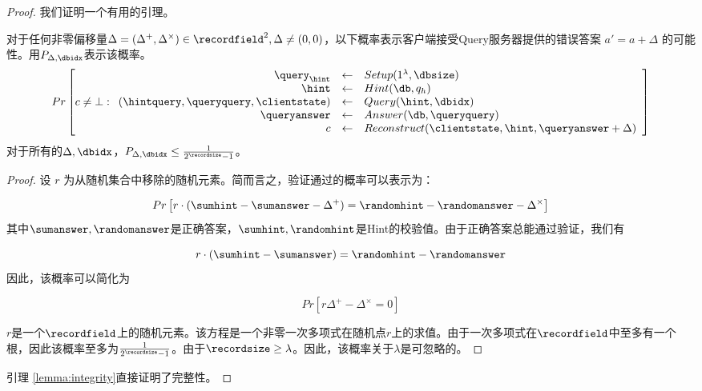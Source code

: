 \begin{proof}

我们证明一个有用的引理。

\begin{lemma}
\label{lemma:integrity}
对于任何非零偏移量$\Delta=(\Delta^+,\Delta^\times)\in \recordfield^2, \Delta \neq (0, 0)$，以下概率表示客户端接受Query服务器提供的错误答案 $a'=a + \Delta$ 的可能性。用$P_{\Delta, \dbidx}$表示该概率。
$$ Pr\left[
    c\neq \bot:
    \begin{array}{rcl}
        \query_\hint                          & \leftarrow & Setup(1^\lambda, \dbsize)                               \\
        \hint                                 & \leftarrow & Hint(\db, q_h)                                          \\
        (\hintquery,\queryquery,\clientstate) & \leftarrow & Query(\hint, \dbidx)                                    \\
        \queryanswer                          & \leftarrow & Answer(\db, \queryquery)                           \\
        c                                     & \leftarrow & Reconstruct(\clientstate, \hint, \queryanswer + \Delta) \\
    \end{array}
    \right]$$
对于所有的$\Delta, \dbidx$，$P_{\Delta, \dbidx} \leq \frac{1}{2^\recordsize-1}$。
\end{lemma}

\begin{proof}
设 $r$ 为从随机集合中移除的随机元素。简而言之，验证通过的概率可以表示为：

$$ Pr\left[ r\cdot(\sumhint-\sumanswer - \Delta^+) = \randomhint - \randomanswer -\Delta^\times \right]$$
其中$\sumanswer,\randomanswer$是正确答案，$\sumhint, \randomhint$是Hint的校验值。由于正确答案总能通过验证，我们有

$$ r\cdot(\sumhint-\sumanswer)=\randomhint - \randomanswer $$
因此，该概率可以简化为

$$ Pr\left[ r\Delta^+ - \Delta^\times = 0 \right]$$

$r$是一个$\recordfield$上的随机元素。该方程是一个非零一次多项式在随机点$r$上的求值。由于一次多项式在$\recordfield$中至多有一个根，因此该概率至多为$\frac{1}{2^\recordsize-1}$。由于$\recordsize\ge\lambda$。因此，该概率关于$\lambda$是可忽略的。
\end{proof}

引理 \ref{lemma:integrity}直接证明了完整性。
\end{proof}

